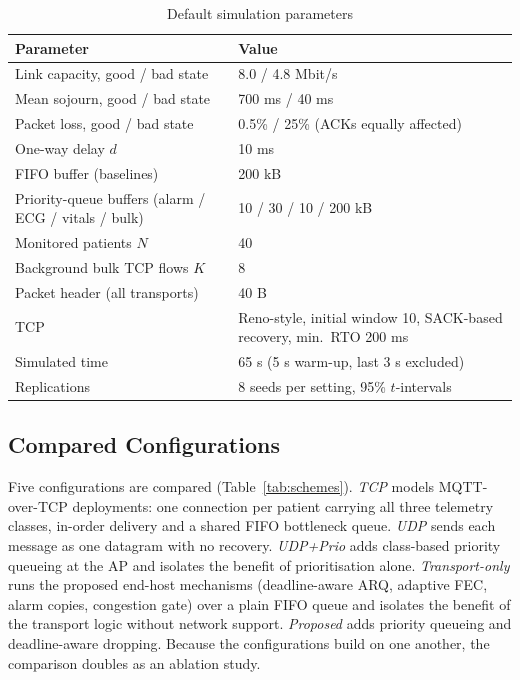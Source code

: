 \documentclass[10pt,twocolumn,letterpaper]{article}
\begin{document}
\begin{table}[t]
\centering
\caption{Default simulation parameters}
\label{tab:params}
\footnotesize
\setlength{\tabcolsep}{3pt}
\begin{tabular}{@{}p{1.6in}p{1.8in}@{}}
\toprule
Parameter & Value\\
\midrule
Link capacity, good / bad state & 8.0 / 4.8 Mbit/s\\
Mean sojourn, good / bad state & 700 ms / 40 ms\\
Packet loss, good / bad state & 0.5\% / 25\% (ACKs equally affected)\\
One-way delay $d$ & 10 ms\\
FIFO buffer (baselines) & 200 kB\\
Priority-queue buffers (alarm / ECG / vitals / bulk) & 10 / 30 / 10 / 200 kB\\
Monitored patients $N$ & 40\\
Background bulk TCP flows $K$ & 8\\
Packet header (all transports) & 40 B\\
TCP & Reno-style, initial window 10, SACK-based recovery, min.\ RTO 200 ms\\
Simulated time & 65 s (5 s warm-up, last 3 s excluded)\\
Replications & 8 seeds per setting, 95\% $t$-intervals\\
\bottomrule
\end{tabular}
\end{table}

\subsection{Compared Configurations}
Five configurations are compared (Table~\ref{tab:schemes}). \emph{TCP} models MQTT-over-TCP deployments: one connection per patient carrying all three telemetry classes, in-order delivery and a shared FIFO bottleneck queue. \emph{UDP} sends each message as one datagram with no recovery. \emph{UDP+Prio} adds class-based priority queueing at the AP and isolates the benefit of prioritisation alone. \emph{Transport-only} runs the proposed end-host mechanisms (deadline-aware ARQ, adaptive FEC, alarm copies, congestion gate) over a plain FIFO queue and isolates the benefit of the transport logic without network support. \emph{Proposed} adds priority queueing and deadline-aware dropping. Because the configurations build on one another, the comparison doubles as an ablation study.
\end{document}
